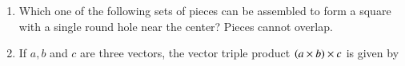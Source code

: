 \documentclass[journal,12pt,onecolumn]{IEEEtran}
\theoremstyle{remark}
\begin{document}
\begin{enumerate}
    \item Which one of the following sets of pieces can be assembled to form a square with a single round hole near the center? Pieces cannot overlap.
    
    \hfill{}

    \item If $a, b$ and $c$ are three vectors, the vector triple product $\left(a\times b\right)\times c$ is given by

    \hfill{}
    \begin{enumerate}
    \end{enumerate}


\end{enumerate}
\end{document}
